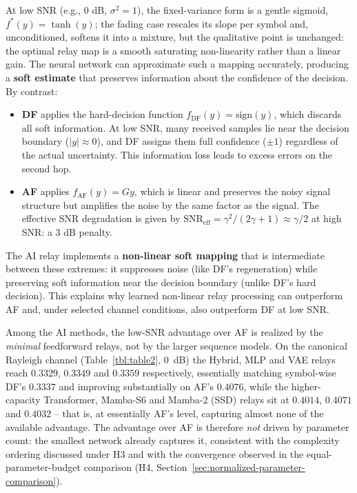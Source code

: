 At low SNR (e.g., 0 dB, \(\sigma^2 = 1\)), the fixed-variance form is a gentle sigmoid, \(f^*(y) = \tanh(y)\); the fading case rescales its slope per symbol and, unconditioned, softens it into a mixture, but the qualitative point is unchanged: the optimal relay map is a smooth saturating non-linearity rather than a linear gain. The neural network can approximate such a mapping accurately, producing a \textbf{soft estimate} that preserves information about the confidence of the decision. By contrast:

\begin{itemize}
\item
  \textbf{DF} applies the hard-decision function \(f_{\text{DF}}(y) = \text{sign}(y)\), which discards all soft information. At low SNR, many received samples lie near the decision boundary (\(|y| \approx 0\)), and DF assigns them full confidence (\(\pm 1\)) regardless of the actual uncertainty. This information loss leads to excess errors on the second hop.
\item
  \textbf{AF} applies \(f_{\text{AF}}(y) = Gy\), which is linear and preserves the noisy signal structure but amplifies the noise by the same factor as the signal. The effective SNR degradation is given by \(\text{SNR}_{\text{eff}} = \gamma^2 / (2\gamma + 1) \approx \gamma/2\) at high SNR: a 3 dB penalty.
\end{itemize}

The AI relay implements a \textbf{non-linear soft mapping} that is intermediate between these extremes: it suppresses noise (like DF's regeneration) while preserving soft information near the decision boundary (unlike DF's hard decision). This explains why learned non-linear relay processing can outperform AF and, under selected channel conditions, also outperform DF at low SNR.

Among the AI methods, the low-SNR advantage over AF is realized by the \emph{minimal} feedforward relays, not by the larger sequence models. On the canonical Rayleigh channel (Table~\ref{tbl:table2}, 0~dB) the Hybrid, MLP and VAE relays reach $0.3329$, $0.3349$ and $0.3359$ respectively, essentially matching symbol-wise DF's $0.3337$ and improving substantially on AF's $0.4076$, while the higher-capacity Transformer, Mamba-S6 and Mamba-2 (SSD) relays sit at $0.4014$, $0.4071$ and $0.4032$ -- that is, at essentially AF's level, capturing almost none of the available advantage. The advantage over AF is therefore \emph{not} driven by parameter count: the smallest network already captures it, consistent with the complexity ordering discussed under H3 and with the convergence observed in the equal-parameter-budget comparison (H4, Section~\ref{sec:normalized-parameter-comparison}).

